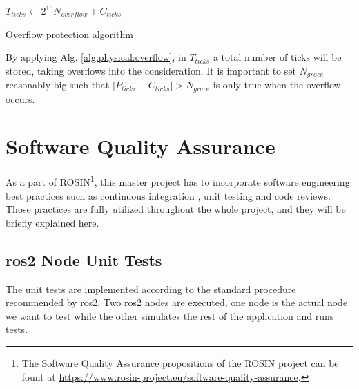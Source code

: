 \vspace*{.4cm}
\begin{algorithm}[H]

$ T_{ticks} \leftarrow 2^{16} N_{overflow} + C_{ticks} $\;

\caption{Overflow protection algorithm}
\label{alg:physical:overflow}
\end{algorithm}
\vspace*{.4cm}

By applying Alg. \ref{alg:physical:overflow}, in $ T_{ticks} $ a total number of ticks will be stored, taking overflows into the consideration. It is important to set $ N_{grace} $ reasonably big such that $ |P_{ticks} - C_{ticks}| > N_{grace} $ is only true when the overflow occurs.

\section{Software Quality Assurance}
As a part of ROSIN\footnote{The Software Quality Assurance propositions of the ROSIN project can be fount at \url{https://www.rosin-project.eu/software-quality-assurance}.}, this master project has to incorporate software engineering best practices such as continuous integration \cite{meyer_continuous_2014}, unit testing and code reviews. Those practices are fully utilized throughout the whole project, and they will be briefly explained here.

\subsection{\ac{ros2} Node Unit Tests}

The unit tests are implemented according to the standard procedure recommended by \ac{ros2}.
Two \ac{ros2} nodes are executed, one node is the actual node we want to test while the other simulates the rest of the application and runs tests. 

